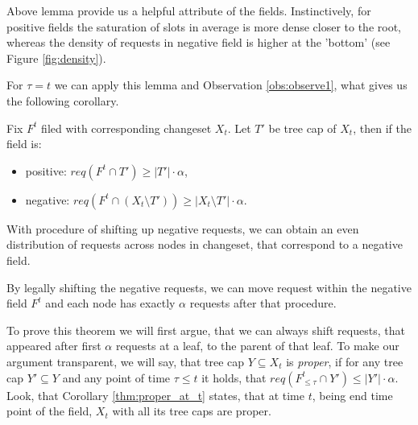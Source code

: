 Above lemma provide us a helpful attribute of the fields. Instinctively, for positive 
fields the saturation of slots in average is more dense closer to 
the root, whereas the density of requests in negative field is higher at the 
'bottom' (see Figure \ref{fig:density}).

For $\tau = t$ we can apply this lemma and Observation \ref{obs:observe1}, 
what gives us the following corollary.
\begin{corollary}
Fix $F^t$ filed with corresponding changeset $X_t$. Let $T'$ be tree cap of 
$X_t$, then if the field is:
 \begin{itemize}
  \item positive: $req(F^t \cap T') \geq |T'| \cdot \alpha$,
  \item negative: $req(F^t \cap (X_t \setminus T')) \geq |X_t \setminus 
T'| \cdot \alpha$.
 \end{itemize}
 \label{thm:proper_at_t}
\end{corollary}


With procedure of shifting up negative requests, we can obtain an even 
distribution of requests across nodes in changeset, that  correspond to 
a negative field.
\begin{theorem}
By legally shifting the negative requests, we can move request within the 
negative field $F^t$ and each node has exactly $\alpha$ requests after that 
procedure.
\label{thm:legal_shifting_up}
\end{theorem}
To prove this theorem we will first argue, that we can always 
shift requests, that appeared after first $\alpha$ requests at a leaf, to the 
parent of that leaf. To make our argument transparent, we will say, that tree 
cap $Y \subseteq X_t$ is \textit{proper}, if for any tree cap $Y' \subseteq Y$ 
and any point of time $\tau \leq t$ it holds, that 
$req(F^t_{\leq \tau} \cap Y') \leq |Y'| \cdot \alpha$. Look, that Corollary 
\ref{thm:proper_at_t} states, that at time $t$, being end time point of the 
field, $X_t$ with all its tree caps are proper.

